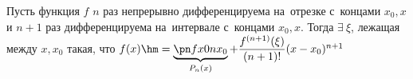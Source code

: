 \label{OCHL}
    Пусть функция $f$ $n$ раз непрерывно дифференцируема на~отрезке с~концами $x_0,x$ и $n+1$ раз дифференцируема на~интервале с~концами
    $x_0,x$.
    Тогда $\exists\  \xi$, лежащая между $x,x_0$ такая, что $f(x)\hm=\underbrace{\pn fx0n{x_0}}_{P_n(x)}+\dfrac{f^{(n+1)}(\xi)}{(n+1)!}(x-x_0)^{n+1}$
